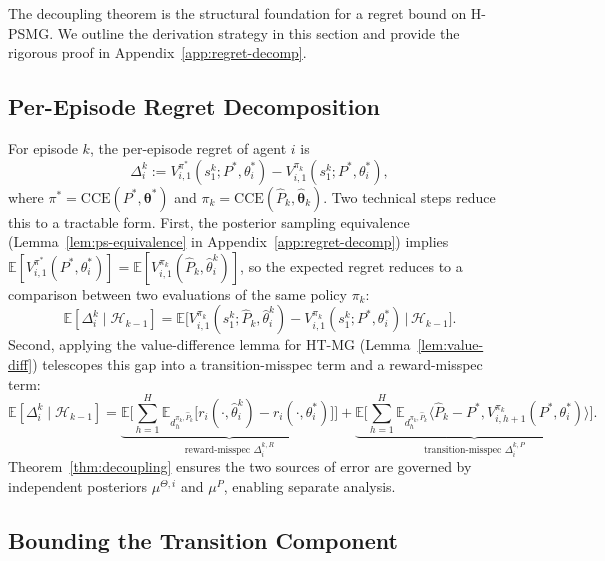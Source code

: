 \documentclass{article}
\begin{document}
The decoupling theorem is the structural foundation for a regret bound on H-PSMG. We outline the derivation strategy in this section and provide the rigorous proof in Appendix~\ref{app:regret-decomp}.

\subsection{Per-Episode Regret Decomposition}

For episode $k$, the per-episode regret of agent $i$ is
\begin{equation}
\Delta_i^k := V_{i,1}^{\pi^*}(s_1^k; P^*, \theta_i^*) - V_{i,1}^{\pi_k}(s_1^k; P^*, \theta_i^*),
\end{equation}
where $\pi^* = \mathrm{CCE}(P^*, \boldsymbol{\theta}^*)$ and $\pi_k = \mathrm{CCE}(\hat{P}_k, \hat{\boldsymbol{\theta}}_k)$. Two technical steps reduce this to a tractable form. First, the posterior sampling equivalence (Lemma~\ref{lem:ps-equivalence} in Appendix~\ref{app:regret-decomp}) implies $\mathbb{E}[V_{i,1}^{\pi^*}(P^*, \theta_i^*)] = \mathbb{E}[V_{i,1}^{\pi_k}(\hat{P}_k, \hat{\theta}_i^k)]$, so the expected regret reduces to a comparison between two evaluations of the same policy $\pi_k$:
\begin{equation}
\mathbb{E}[\Delta_i^k \mid \mathcal{H}_{k-1}] = \mathbb{E}\big[V_{i,1}^{\pi_k}(s_1^k; \hat{P}_k, \hat{\theta}_i^k) - V_{i,1}^{\pi_k}(s_1^k; P^*, \theta_i^*) \,\big|\, \mathcal{H}_{k-1}\big].
\end{equation}
Second, applying the value-difference lemma for HT-MG (Lemma~\ref{lem:value-diff}) telescopes this gap into a transition-misspec term and a reward-misspec term:
\begin{equation}
\mathbb{E}[\Delta_i^k \mid \mathcal{H}_{k-1}] = \underbrace{\mathbb{E}\Big[\sum_{h=1}^H \mathbb{E}_{d_h^{\pi_k, \hat{P}_k}}\big[r_i(\cdot, \hat{\theta}_i^k) - r_i(\cdot, \theta_i^*)\big]\Big]}_{\text{reward-misspec } \Delta_i^{k,R}} + \underbrace{\mathbb{E}\Big[\sum_{h=1}^H \mathbb{E}_{d_h^{\pi_k, \hat{P}_k}}\big\langle \hat{P}_k - P^*, V_{i,h+1}^{\pi_k}(P^*, \theta_i^*)\big\rangle\Big]}_{\text{transition-misspec } \Delta_i^{k,P}}.
\end{equation}
Theorem~\ref{thm:decoupling} ensures the two sources of error are governed by independent posteriors $\mu^{\Theta,i}$ and $\mu^P$, enabling separate analysis.

\subsection{Bounding the Transition Component}
\end{document}
